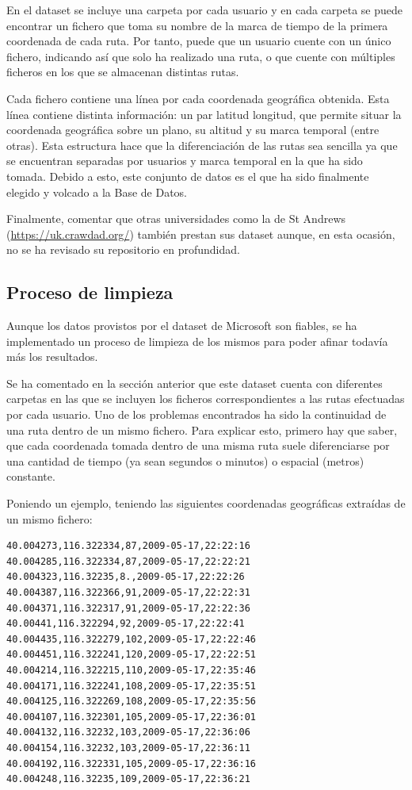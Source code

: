 En el dataset se incluye una carpeta por cada usuario y en cada carpeta se puede encontrar un fichero que toma su nombre de la marca de tiempo de la primera coordenada de cada ruta. Por tanto, puede que un usuario cuente con un único fichero, indicando así que solo ha realizado una ruta, o que cuente con múltiples ficheros en los que se almacenan distintas rutas.

Cada fichero contiene una línea por cada coordenada geográfica obtenida. Esta línea contiene distinta información: un par latitud longitud, que permite situar la coordenada geográfica sobre un plano, su altitud y su marca temporal (entre otras). Esta estructura hace que la diferenciación de las rutas sea sencilla ya que se encuentran separadas por usuarios y marca temporal en la que ha sido tomada. Debido a esto, este conjunto de datos es el que ha sido finalmente elegido y volcado a la Base de Datos.

Finalmente, comentar que otras universidades como la de St Andrews (\url{https://uk.crawdad.org/}) también prestan sus dataset aunque, en esta ocasión, no se ha revisado su repositorio en profundidad.


\subsection{Proceso de limpieza}
Aunque los datos provistos por el dataset de Microsoft son fiables, se ha implementado un proceso de limpieza de los mismos para poder afinar todavía más los resultados.

Se ha comentado en la sección anterior que este dataset cuenta con diferentes carpetas en las que se incluyen los ficheros correspondientes a las rutas efectuadas por cada usuario. Uno de los problemas encontrados ha sido la continuidad de una ruta dentro de un mismo fichero. Para explicar esto, primero hay que saber, que cada coordenada tomada dentro de una misma ruta suele diferenciarse por una cantidad de tiempo (ya sean segundos o minutos) o espacial (metros) constante.

Poniendo un ejemplo, teniendo las siguientes coordenadas geográficas extraídas de un mismo fichero:

\begin{lstlisting}
40.004273,116.322334,87,2009-05-17,22:22:16
40.004285,116.322334,87,2009-05-17,22:22:21
40.004323,116.32235,8.,2009-05-17,22:22:26
40.004387,116.322366,91,2009-05-17,22:22:31
40.004371,116.322317,91,2009-05-17,22:22:36
40.00441,116.322294,92,2009-05-17,22:22:41
40.004435,116.322279,102,2009-05-17,22:22:46
40.004451,116.322241,120,2009-05-17,22:22:51
40.004214,116.322215,110,2009-05-17,22:35:46
40.004171,116.322241,108,2009-05-17,22:35:51
40.004125,116.322269,108,2009-05-17,22:35:56
40.004107,116.322301,105,2009-05-17,22:36:01
40.004132,116.32232,103,2009-05-17,22:36:06
40.004154,116.32232,103,2009-05-17,22:36:11
40.004192,116.322331,105,2009-05-17,22:36:16
40.004248,116.32235,109,2009-05-17,22:36:21
\end{lstlisting}

